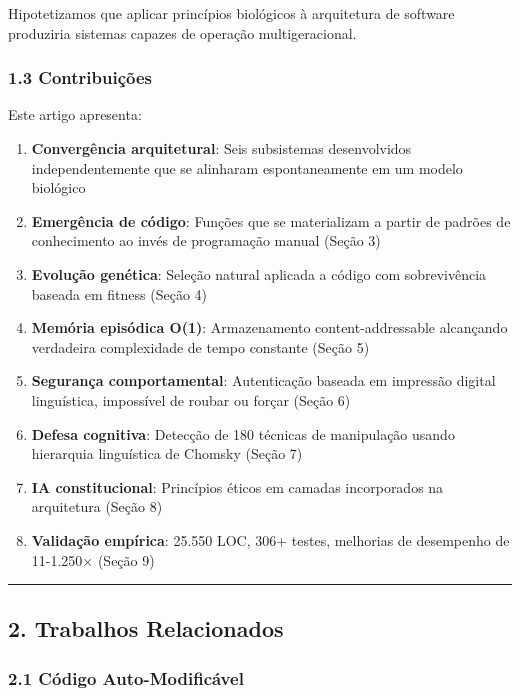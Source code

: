 \documentclass[
]{article}
\providecommand{\tightlist}{%
  \setlength{\itemsep}{0pt}\setlength{\parskip}{0pt}}
\begin{document}
Hipotetizamos que aplicar princípios biológicos à arquitetura de
software produziria sistemas capazes de operação multigeracional.

\subsubsection{1.3 Contribuições}\label{contribuiuxe7uxf5es}

Este artigo apresenta:

\begin{enumerate}
\def\labelenumi{\arabic{enumi}.}
\tightlist
\item
  \textbf{Convergência arquitetural}: Seis subsistemas desenvolvidos
  independentemente que se alinharam espontaneamente em um modelo
  biológico
\item
  \textbf{Emergência de código}: Funções que se materializam a partir de
  padrões de conhecimento ao invés de programação manual (Seção 3)
\item
  \textbf{Evolução genética}: Seleção natural aplicada a código com
  sobrevivência baseada em fitness (Seção 4)
\item
  \textbf{Memória episódica O(1)}: Armazenamento content-addressable
  alcançando verdadeira complexidade de tempo constante (Seção 5)
\item
  \textbf{Segurança comportamental}: Autenticação baseada em impressão
  digital linguística, impossível de roubar ou forçar (Seção 6)
\item
  \textbf{Defesa cognitiva}: Detecção de 180 técnicas de manipulação
  usando hierarquia linguística de Chomsky (Seção 7)
\item
  \textbf{IA constitucional}: Princípios éticos em camadas incorporados
  na arquitetura (Seção 8)
\item
  \textbf{Validação empírica}: 25.550 LOC, 306+ testes, melhorias de
  desempenho de 11-1.250× (Seção 9)
\end{enumerate}

\begin{center}\rule{0.5\linewidth}{0.5pt}\end{center}

\subsection{2. Trabalhos Relacionados}\label{trabalhos-relacionados}

\subsubsection{2.1 Código
Auto-Modificável}\label{cuxf3digo-auto-modificuxe1vel}
\end{document}
